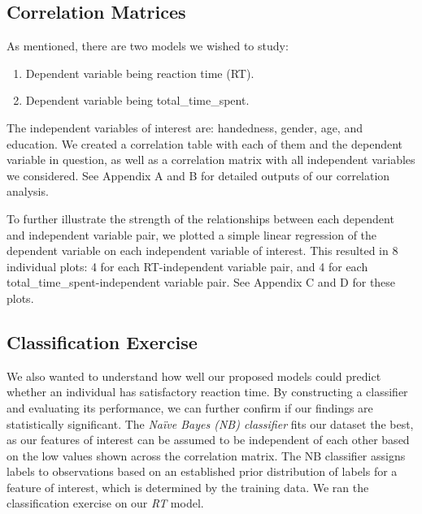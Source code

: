 \documentclass[
]{article}
\providecommand{\tightlist}{%
  \setlength{\itemsep}{0pt}\setlength{\parskip}{0pt}}
\begin{document}
\hypertarget{correlation-matrices}{%
\subsection{Correlation Matrices}\label{correlation-matrices}}

As mentioned, there are two models we wished to study:

\begin{enumerate}
\def\labelenumi{\arabic{enumi}.}
\tightlist
\item
  Dependent variable being reaction time (RT).
\item
  Dependent variable being total\_time\_spent.
\end{enumerate}

The independent variables of interest are: handedness, gender, age, and
education. We created a correlation table with each of them and the
dependent variable in question, as well as a correlation matrix with all
independent variables we considered. See Appendix A and B for detailed
outputs of our correlation analysis.

To further illustrate the strength of the relationships between each
dependent and independent variable pair, we plotted a simple linear
regression of the dependent variable on each independent variable of
interest. This resulted in 8 individual plots: 4 for each RT-independent
variable pair, and 4 for each total\_time\_spent-independent variable
pair. See Appendix C and D for these plots.

\hypertarget{classification-exercise}{%
\subsection{Classification Exercise}\label{classification-exercise}}

We also wanted to understand how well our proposed models could predict
whether an individual has satisfactory reaction time. By constructing a
classifier and evaluating its performance, we can further confirm if our
findings are statistically significant. The \emph{Naïve Bayes (NB)
classifier} fits our dataset the best, as our features of interest can
be assumed to be independent of each other based on the low values shown
across the correlation matrix. The NB classifier assigns labels to
observations based on an established prior distribution of labels for a
feature of interest, which is determined by the training data. We ran
the classification exercise on our \emph{RT} model.
\end{document}
